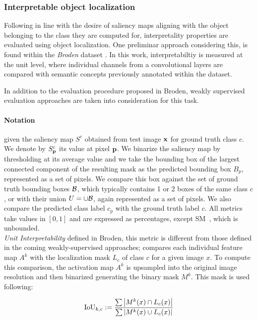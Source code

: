 \subsubsection{Interpretable object localization}
\label{sec:loc-metrics}
Following in line with the desire of saliency maps aligning with the object belonging to the class 
they are computed for, interpretality properties are evaluated using object localization.
One preliminar approach considering this, is found within the \emph{Broden} dataset 
\autocite{bau2017network}. In this work, interpretabiltiy is measured at the unit level, where 
individual channels from a convolutional layers are compared with semantic concepts previously 
annotated within the dataset. 

In addition to the evaluation procedure proposed in Broden, weakly supervised evaluation approaches 
are taken into consideration for this task. 

\paragraph{Notation} given the saliency map $S^c$ obtained from test image $\mathbf{x}$ for ground truth 
class $c$. We denote by $S^c_{\mathbf{p}}$ its value at pixel $\mathbf{p}$. We binarize the saliency map by 
thresholding at its average value and we take the bounding box of the largest connected component 
of the resulting mask as the predicted bounding box $B_p$, represented as a set of pixels. We 
compare this box against the set of ground truth bounding boxes $\mathcal{B}$, which typically contains 1 
or 2 boxes of the same class $c$, or with their union $U = \cup \mathcal{B}$, again represented as a set 
of pixels. We also compare the predicted class label $c_p$ with the ground truth label $c$. All 
metrics take values in $[0,1]$ and are expressed as percentages, except SM~, which is 
unbounded.\\

\emph{Unit Interpretability} defined in Broden, this metric is different from those defined in 
the coming weakly-supervised approaches; compares each individual feature map $A^k$ with the 
localization mask $L_c$ of class $c$ for a given image $x$. To compute this comparison, 
the activation map $A^k$ is upsampled into the original image resolution and then binarized 
generating the binary mask $M^k$. This mask is used following:

\begin{equation}
	\operatorname{IoU}_{k,c} \mathrel{:=} \frac{\sum \abs{M^k(x) \cap L_c(x)}}{\sum \abs{M^k(x) \cup L_c(x)}}
\end{equation}

